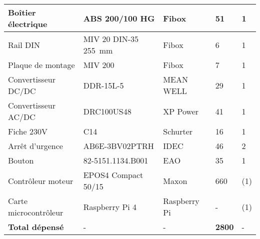 \begin{table}[H]
{\begin{tabular}{|l|l|l|l|l|}
            Boîtier électrique     & ABS 200/100 HG                   & Fibox \cite{Fibox}              & 51                         & 1                 \\ \hline
            Rail DIN               & MIV 20 DIN-35 255~mm             & Fibox \cite{Fibox}              & 6                          & 1                 \\ \hline
            Plaque de montage      & MIV 200                          & Fibox \cite{Fibox}              & 7                          & 1                 \\ \hline
            Convertisseur DC/DC    & DDR-15L-5                        & MEAN WELL \cite{MEANWELL}       & 29                         & 1                 \\ \hline
            Convertisseur AC/DC    & DRC100US48                       & XP Power \cite{XPPower}         & 41                         & 1                 \\ \hline
            Fiche 230V             & C14                              & Schurter \cite{Schurter}        & 16                         & 1                 \\ \hline
            Arrêt d'urgence        & AB6E-3BV02PTRH                   & IDEC \cite{IDEC}                & 46                         & 2                 \\ \hline
            Bouton                 & 82-5151.1134.B001                & EAO \cite{EAO}                  & 35                         & 1                 \\ \hline
            Contrôleur moteur      & EPOS4 Compact 50/15              & Maxon \cite{Maxon}              & 660                        & (1)               \\ \hline
            Carte microcontrôleur  & Raspberry Pi 4                   & Raspberry Pi \cite{RaspberryPi} & -                          & (1)               \\ \hline
            \textbf{Total dépensé} & -                                & -                               & \textbf{2800}\footnotemark & -                 \\ \hline
        \end{tabular}%
    }
\end{table}


